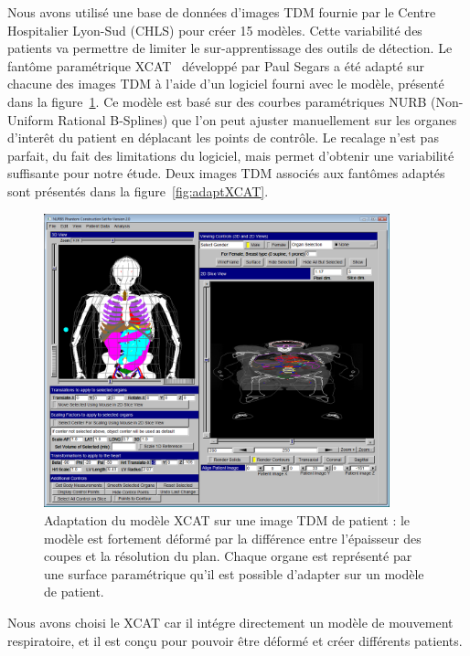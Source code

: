 Nous avons utilisé une base de données d’images TDM fournie par le Centre Hospitalier Lyon-Sud (CHLS) pour créer 15 modèles. Cette variabilité des patients va permettre de limiter le sur-apprentissage des outils de détection. Le fantôme paramétrique XCAT~\cite{segars2009mcatoverview} développé par Paul Segars a été adapté  sur chacune des images TDM à l’aide d’un logiciel fourni avec le modèle, présenté dans la figure~\ref{fig:fitXCAT}. Ce modèle est basé sur des courbes paramétriques NURB (Non-Uniform Rational B-Splines) que l'on peut ajuster manuellement sur les organes d'interêt du patient en déplacant les points de contrôle. Le recalage n’est pas parfait, du fait des limitations du logiciel, mais permet d’obtenir une variabilité suffisante pour notre étude. Deux images TDM associés aux fantômes adaptés sont présentés dans la figure~\ref{fig:adaptXCAT}.

\begin{figure}
 \centering
 \includegraphics[width=10cm]{images/FIT_XCAT}
 \caption[Adaptation du modèle XCAT sur une image TDM de patient]{Adaptation du modèle XCAT sur une image TDM de patient : le modèle est fortement déformé par la différence entre l'épaisseur des coupes et la résolution du plan. Chaque organe est représenté par une surface paramétrique qu’il est possible d’adapter sur un modèle de patient.}
 \label{fig:fitXCAT}
\end{figure}

Nous avons choisi le XCAT car il intégre directement un modèle de mouvement respiratoire, et il est conçu pour pouvoir être déformé et créer différents patients.

